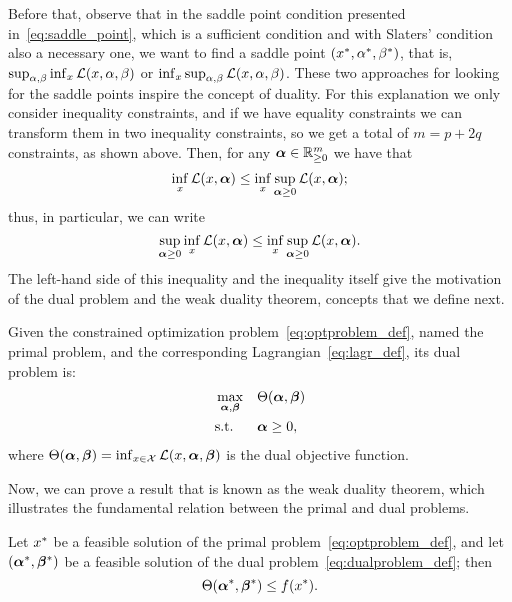 %
Before that, observe that in the saddle point condition presented in~\eqref{eq:saddle_point}, which is a sufficient condition and with Slaters' condition also a necessary one, we want to find a saddle point $({x}^*, {\alpha}^*, {\beta}^*)$, 
%
that is, $\sup_{\alpha, \beta} \inf_{x} \mathcal{L}(x, \alpha, \beta)$ or $\inf_{x} \sup_{\alpha, \beta} \mathcal{L}(x, \alpha, \beta)$. 
%
These two approaches for looking for the saddle points inspire the concept of duality.
%
For this explanation we only consider inequality constraints, and if we have equality constraints we can transform them in two inequality constraints, so we get a total of $m = p + 2q$ constraints, as shown above. Then, for any $\bm{\alpha} \in \mathbb{R}^m_{\geq 0}$ we have that
\begin{equation}
    \nonumber
    \inf_{x} \mathcal{L}(x, \bm{\alpha}) \leq \inf_{x} \sup_{\bm{\alpha} \geq 0} \mathcal{L}(x, \bm{\alpha});
\end{equation}
thus, in particular, we can write
\begin{equation}
    \label{eq:lagr_weakth}
    \sup_{\fv{\alpha} \geq 0} \inf_{x} \lagr(x, \fv{\alpha}) \leq \inf_{x} \sup_{\fv{\alpha} \geq 0} \lagr(x, \fv{\alpha}).
\end{equation}
The left-hand side of this inequality and the inequality itself give the motivation of the dual problem and the weak duality theorem, concepts that we define next.
%
\begin{definition}\label{def:dual_problem}
    Given the constrained optimization problem~\eqref{eq:optproblem_def}, named the primal problem, and the corresponding Lagrangian~\eqref{eq:lagr_def}, its dual problem is:
    \begin{equation}\label{eq:dualproblem_def}
        \begin{aligned}
            &\max_{\fv{\alpha}, \fv{\beta}} & & \Theta(\fv{\alpha}, \fv{\beta}) \\
            & \text{s.t.} & & \fv{\alpha} \geq 0 ,          
        \end{aligned}  
    \end{equation}
    where $\Theta(\bm{\alpha}, \bm{\beta}) = \inf_{x \in \mathcal{X}}\mathcal{L}(x, \bm{\alpha}, \bm{\beta})$ is the dual objective function.
\end{definition}
%
Now, we can prove a result that is known as the weak duality theorem, which illustrates the fundamental relation between the primal and dual problems.
%
\begin{theorem}
    Let ${x}^*$ be a feasible solution of the primal problem~\eqref{eq:optproblem_def}, and let $({\bm{\alpha}}^*, {\bm{\beta}}^*)$ be a feasible solution of the dual problem~\eqref{eq:dualproblem_def}; then 
    $$ \Theta({\bm{\alpha}}^*, {\bm{\beta}}^*) \leq f({x}^*) .$$
\end{theorem}
